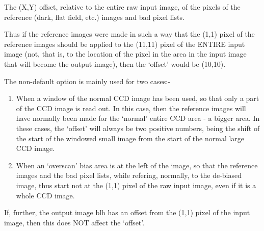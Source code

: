 \begin{small}
{{{  The (X,Y) offset, relative to the entire raw input image, of the
  pixels of the reference (dark, flat field, etc.) images and bad
  pixel lists.
 
  Thus if the reference images were made in such a way that the (1,1)
  pixel of the reference images should be applied to the (11,11) pixel
  of the ENTIRE input image (not, that is, to the location of the
  pixel in the area in the input image that will become the output
  image), then the `offset' would be (10,10).
 
  The non-default option is mainly used for two cases:-
 
 \begin{enumerate}
 
 \item When a window of the normal CCD image has been used, so that only
     a part of the CCD image is read out. In this case, then the
     reference images will have normally been made for the `normal'
     entire CCD area - a bigger area. In these cases, the `offset'
     will always be two positive numbers, being the shift of the start
     of the windowed small image from the start of the normal large
     CCD image.
 
 \item When an `overscan' bias area is at the left of the image, so that
     the reference images and the bad pixel lists, while refering,
     normally, to the de-biased image, thus start not at the (1,1)
     pixel of the raw input image, even if it is a whole CCD image.
 
 \end{enumerate}
 
  If, further, the output image blh has an offset from the (1,1) pixel
  of the input image, then this does NOT affect the `offset'.
 
}}}
\end{small}

